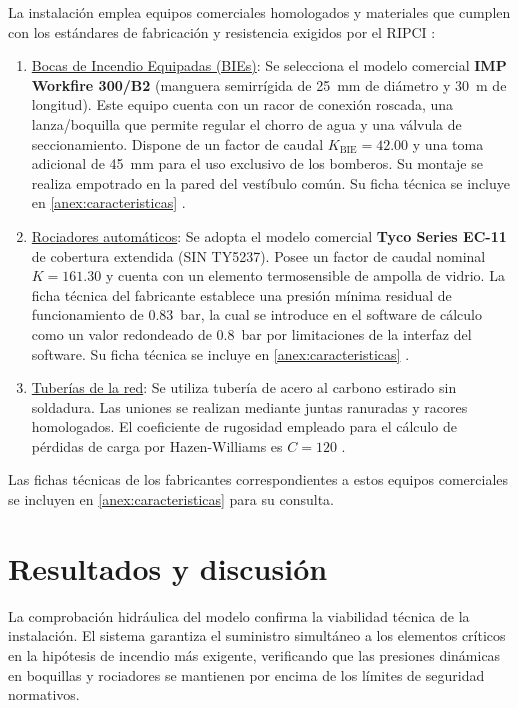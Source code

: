 \documentclass[12pt,a4paper]{article}
\begin{document}
La instalación emplea equipos comerciales homologados y materiales que cumplen con los estándares de fabricación y resistencia exigidos por el RIPCI \parencite{RIPCI_2017,RIPCI_GUIA_2022}:
\begin{enumerate}
	\item \underline{Bocas de Incendio Equipadas (BIEs)}:
	   Se selecciona el modelo comercial \textbf{IMP Workfire 300/B2} (manguera semirrígida de \SI{25}{\milli\meter} de diámetro y \SI{30}{\meter} de longitud). Este equipo cuenta con un racor de conexión roscada, una lanza/boquilla que permite regular el chorro de agua y una válvula de seccionamiento. Dispone de un factor de caudal $K_{\text{BIE}} = 42.00$ y una toma adicional de \SI{45}{\milli\meter} para el uso exclusivo de los bomberos. Su montaje se realiza empotrado en la pared del vestíbulo común. Su ficha técnica se incluye en \cref{anex:caracteristicas} \parencite{IMP_WORKFIRE_300B2}.
	\item \underline{Rociadores automáticos}:
	   Se adopta el modelo comercial \textbf{Tyco Series EC-11} de cobertura extendida (SIN TY5237). Posee un factor de caudal nominal $K = 161.30$ y cuenta con un elemento termosensible de ampolla de vidrio. La ficha técnica del fabricante establece una presión mínima residual de funcionamiento de \SI{0.83}{\bar}, la cual se introduce en el software de cálculo como un valor redondeado de \SI{0.8}{\bar} por limitaciones de la interfaz del software. Su ficha técnica se incluye en \cref{anex:caracteristicas} \parencite{TYCO_EC11}.
	\item \underline{Tuberías de la red}:
	   Se utiliza tubería de acero al carbono estirado sin soldadura. Las uniones se realizan mediante juntas ranuradas y racores homologados. El coeficiente de rugosidad empleado para el cálculo de pérdidas de carga por Hazen-Williams es $C = 120$ \parencite{UNE_EN_12845}.
\end{enumerate}

Las fichas técnicas de los fabricantes correspondientes a estos equipos comerciales se incluyen en \cref{anex:caracteristicas} para su consulta.

\section{Resultados y discusión}

La comprobación hidráulica del modelo confirma la viabilidad técnica de la instalación. El sistema garantiza el suministro simultáneo a los elementos críticos en la hipótesis de incendio más exigente, verificando que las presiones dinámicas en boquillas y rociadores se mantienen por encima de los límites de seguridad normativos.
\end{document}
